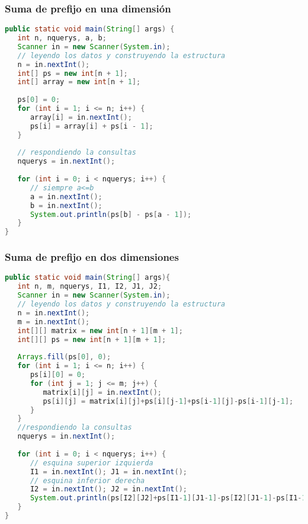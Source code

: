 \subsubsection{Suma de prefijo en una dimensión}
\begin{lstlisting}[language=Java]
public static void main(String[] args) {
   int n, nquerys, a, b;
   Scanner in = new Scanner(System.in);
   // leyendo los datos y construyendo la estructura
   n = in.nextInt();
   int[] ps = new int[n + 1];
   int[] array = new int[n + 1];
   
   ps[0] = 0;
   for (int i = 1; i <= n; i++) {
      array[i] = in.nextInt();
      ps[i] = array[i] + ps[i - 1];
   }
	
   // respondiendo la consultas
   nquerys = in.nextInt();
	
   for (int i = 0; i < nquerys; i++) {
      // siempre a<=b
      a = in.nextInt();
      b = in.nextInt();
      System.out.println(ps[b] - ps[a - 1]);
   }
}
\end{lstlisting}
\subsubsection{Suma de prefijo en dos dimensiones}
\begin{lstlisting}[language=Java]
public static void main(String[] args){
   int n, m, nquerys, I1, I2, J1, J2;
   Scanner in = new Scanner(System.in);
   // leyendo los datos y construyendo la estructura
   n = in.nextInt();
   m = in.nextInt();
   int[][] matrix = new int[n + 1][m + 1];
   int[][] ps = new int[n + 1][m + 1];
	
   Arrays.fill(ps[0], 0);
   for (int i = 1; i <= n; i++) {
      ps[i][0] = 0;
      for (int j = 1; j <= m; j++) {
         matrix[i][j] = in.nextInt();
         ps[i][j] = matrix[i][j]+ps[i][j-1]+ps[i-1][j]-ps[i-1][j-1];
      }
   }
   //respondiendo la consultas
   nquerys = in.nextInt();
	
   for (int i = 0; i < nquerys; i++) {
      // esquina superior izquierda
      I1 = in.nextInt(); J1 = in.nextInt();
      // esquina inferior derecha
      I2 = in.nextInt(); J2 = in.nextInt();
      System.out.println(ps[I2][J2]+ps[I1-1][J1-1]-ps[I2][J1-1]-ps[I1-1][J2]);
   }
}
\end{lstlisting}